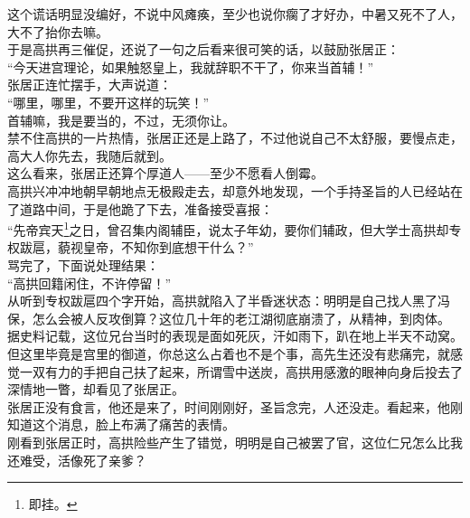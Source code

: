 \begin{multicols}{\theparacolNo}
这个谎话明显没编好，不说中风瘫痪，至少也说你瘸了才好办，中暑又死不了人，大不了抬你去嘛。\\

于是高拱再三催促，还说了一句之后看来很可笑的话，以鼓励张居正：\\

“今天进宫理论，如果触怒皇上，我就辞职不干了，你来当首辅！”\\

张居正连忙摆手，大声说道：\\

“哪里，哪里，不要开这样的玩笑！”\\

首辅嘛，我是要当的，不过，无须你让。\\

禁不住高拱的一片热情，张居正还是上路了，不过他说自己不太舒服，要慢点走，高大人你先去，我随后就到。\\

这么看来，张居正还算个厚道人——至少不愿看人倒霉。\\

高拱兴冲冲地朝早朝地点无极殿走去，却意外地发现，一个手持圣旨的人已经站在了道路中间，于是他跪了下去，准备接受喜报：\\

“先帝宾天\footnote{即挂。}之日，曾召集内阁辅臣，说太子年幼，要你们辅政，但大学士高拱却专权跋扈，藐视皇帝，不知你到底想干什么？”\\

骂完了，下面说处理结果：\\

“高拱回籍闲住，不许停留！”\\

从听到专权跋扈四个字开始，高拱就陷入了半昏迷状态：明明是自己找人黑了冯保，怎么会被人反攻倒算？这位几十年的老江湖彻底崩溃了，从精神，到肉体。\\

据史料记载，这位兄台当时的表现是面如死灰，汗如雨下，趴在地上半天不动窝。\\

但这里毕竟是宫里的御道，你总这么占着也不是个事，高先生还没有悲痛完，就感觉一双有力的手把自己扶了起来，所谓雪中送炭，高拱用感激的眼神向身后投去了深情地一瞥，却看见了张居正。\\

张居正没有食言，他还是来了，时间刚刚好，圣旨念完，人还没走。看起来，他刚知道这个消息，脸上布满了痛苦的表情。\\

刚看到张居正时，高拱险些产生了错觉，明明是自己被罢了官，这位仁兄怎么比我还难受，活像死了亲爹？\\


\end{multicols}
